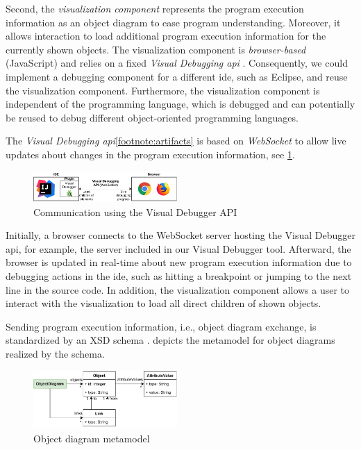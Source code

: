 \documentclass[conference]{IEEEtran}
\begin{document}
Second, the \textit{visualization component} represents the program execution information as an object diagram to ease program understanding.
Moreover, it allows interaction to load additional program execution information for the currently shown objects.
The visualization component is \emph{browser-based} (JavaScript) and relies on a fixed \emph{Visual Debugging \gls*{api}} \cite{timkrauterArtifactsICSME2022}.
Consequently, we could implement a debugging component for a different \gls*{ide}, such as Eclipse, and reuse the visualization component.
Furthermore, the visualization component is independent of the programming language, which is debugged and can potentially be reused to debug different object-oriented programming languages.

The \textit{Visual Debugging \gls*{api}}\cref{footnote:artifacts} is based on \emph{WebSocket} to allow live updates about changes in the program execution information, see \cref{fig:api}.

\begin{figure}[h]
    \centering
    \includegraphics[width=0.488\textwidth]{images/VD-architecture.pdf}
    \caption{Communication using the Visual Debugger API}
    \label{fig:api}
\end{figure}

Initially, a browser connects to the WebSocket server hosting the Visual Debugger \gls*{api}, for example, the server included in our Visual Debugger tool.
Afterward, the browser is updated in real-time about new program execution information due to debugging actions in the \gls*{ide}, such as hitting a breakpoint or jumping to the next line in the source code.
In addition, the visualization component allows a user to interact with the visualization to load all direct children of shown objects.

Sending program execution information, i.e., object diagram exchange, is standardized by an XSD schema \cite{timkrauterArtifactsICSME2022}.
 depicts the metamodel for object diagrams realized by the schema.

\begin{figure}[h]
    \centering
    \includegraphics[width=0.488\textwidth]{images/VD-metamodel.pdf}
    \caption{Object diagram metamodel}
    \label{fig:odMetamodel}
\end{figure}
\end{document}

